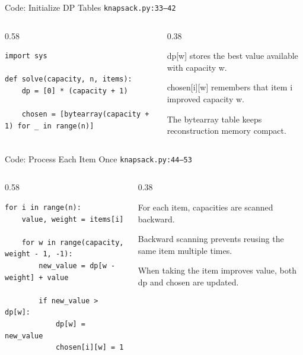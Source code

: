 \documentclass[aspectratio=169,11pt]{beamer}
\begin{document}
\begin{frame}[fragile]{Code: Initialize DP Tables}
\scriptsize
{} \texttt{knapsack.py:33--42}

\vspace{0.08cm}
\begin{columns}[T,totalwidth=\textwidth]
\begin{column}{0.58\textwidth}
\begin{lstlisting}[style=cpcode]
import sys

def solve(capacity, n, items):
    dp = [0] * (capacity + 1)

    chosen = [bytearray(capacity + 1) for _ in range(n)]
\end{lstlisting}
\end{column}
\begin{column}{0.38\textwidth}
\begin{tightitemize}
  \item dp[w] stores the best value available with capacity w.
  \item chosen[i][w] remembers that item i improved capacity w.
  \item The bytearray table keeps reconstruction memory compact.
\end{tightitemize}
\end{column}
\end{columns}
\end{frame}

\begin{frame}[fragile]{Code: Process Each Item Once}
\scriptsize
{} \texttt{knapsack.py:44--53}

\vspace{0.08cm}
\begin{columns}[T,totalwidth=\textwidth]
\begin{column}{0.58\textwidth}
\begin{lstlisting}[style=cpcode]
for i in range(n):
    value, weight = items[i]

    for w in range(capacity, weight - 1, -1):
        new_value = dp[w - weight] + value

        if new_value > dp[w]:
            dp[w] = new_value
            chosen[i][w] = 1
\end{lstlisting}
\end{column}
\begin{column}{0.38\textwidth}
\begin{tightitemize}
  \item For each item, capacities are scanned backward.
  \item Backward scanning prevents reusing the same item multiple times.
  \item When taking the item improves value, both dp and chosen are updated.
\end{tightitemize}
\end{column}
\end{columns}
\end{frame}
\end{document}
